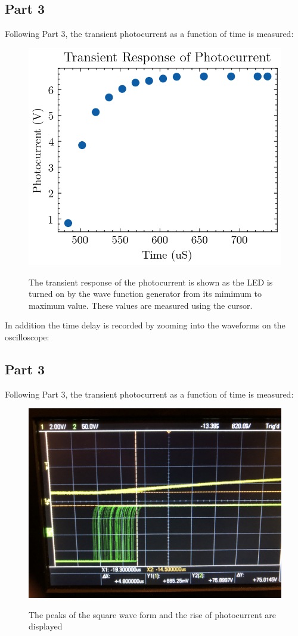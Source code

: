 \documentclass[12pt,twocolumn]{article}
\begin{document}
\subsection*{Part 3}
Following Part 3, the transient photocurrent as a function of time is measured:
\begin{figure}[H]
\begin{centering}
\includegraphics[width=0.5 \textwidth]{img/part3.png}
\label{fig:p3}
\caption{The transient response of the photocurrent is shown as the LED is turned on by the wave function generator from its mimimum to maximum value. These values are measured using the cursor.}
\end{centering}
\end{figure}

In addition the time delay is recorded by zooming into the waveforms on the oscilloscope:
\subsection*{Part 3}
Following Part 3, the transient photocurrent as a function of time is measured:
\begin{figure}[H]
\begin{centering}
\includegraphics[width=0.5 \textwidth]{img/IMG_4503.JPG}
\label{fig:p3b}
\caption{The peaks of the square wave form and the rise of photocurrent are displayed}
\end{centering}
\end{figure}
\end{document}
